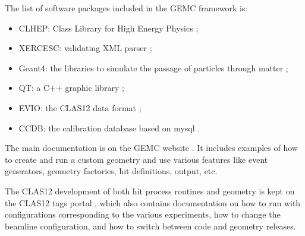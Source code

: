 The list of software packages included in the GEMC framework is:

\begin{itemize}
	\item CLHEP: Class Library for High Energy Physics \cite{clhep};
	\item XERCESC: validating XML parser \cite{xercesc};
	\item Geant4: the libraries to simulate the passage of particles through matter \cite{geant4};
	\item QT: a C++ graphic library \cite{qt};
	\item EVIO: the CLAS12 data format \cite{evio};
	\item CCDB: the calibration database based on mysql \cite{ccdb}.
\end{itemize}

The main documentation is on the GEMC website \cite{GEMC}. It includes examples of how to create and run a custom geometry
and use various features like event generators, geometry factories, hit definitions, output, etc.

The CLAS12 development of both hit process routines and geometry is kept on the CLAS12 tags portal \cite{clas12Tags},
which also contains documentation on how to run with configurations corresponding to the various experiments, how to change the
beamline configuration, and how to switch between code and geometry releases.






